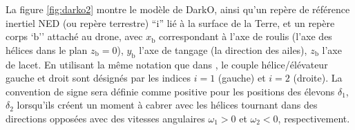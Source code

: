 La figure \ref{fig:darko2} montre le modèle de DarkO, ainsi qu'un repère de référence inertiel NED (ou repère terrestre) ``$\text{i}$'' lié à la surface de la Terre, et un repère corps `$\text{b}$'' attaché au drone, avec $x_{\text{b}}$ correspondant à l'axe de roulis (l'axe des hélices dans le plan $z_{ \text{b} } = 0$), $y_{\text{b}}$ l'axe de tangage (la direction des ailes), $z_{\text{b}}$ l'axe de lacet. En utilisant la même notation que dans \cite{lustosaHal-03035938}, le couple hélice/élévateur gauche et droit sont désignés par les indices $i=1$ (gauche) et $i=2$ (droite). La convention de signe sera définie comme positive pour les positions des élevons $\delta_{1}$, $\delta_{2}$ lorsqu'ils créent un moment à cabrer avec les hélices tournant dans des directions opposées avec des vitesses angulaires $\omega_{1} > 0$ et $\omega_{2} < 0$, respectivement.

